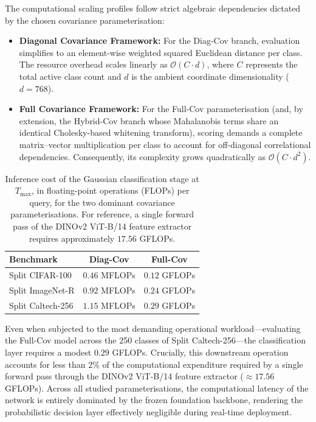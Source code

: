 The computational scaling profiles follow strict algebraic dependencies dictated by the chosen covariance parameterisation:
\begin{itemize}
	\item \textbf{Diagonal Covariance Framework:} For the Diag-Cov branch, evaluation simplifies to an element-wise weighted squared Euclidean distance per class. The resource overhead scales linearly as $\mathcal{O}(C \cdot d)$, where $C$ represents the total active class count and $d$ is the ambient coordinate dimensionality ($d = 768$).
	\item \textbf{Full Covariance Framework:} For the Full-Cov parameterisation (and, by extension, the Hybrid-Cov branch whose Mahalanobis terms share an identical Cholesky-based whitening transform), scoring demands a complete matrix--vector multiplication per class to account for off-diagonal correlational dependencies. Consequently, its complexity grows quadratically as $\mathcal{O}(C \cdot d^2)$.
\end{itemize}

\begin{table}[htbp]
	\centering
	\caption{Inference cost of the Gaussian classification stage at $T_{\max}$, in floating-point operations (FLOPs) per query, for the two dominant covariance parameterisations. For reference, a single forward pass of the DINOv2 ViT-B/14 feature extractor requires approximately $17.56$ GFLOPs.}
	\label{tab:computational_requirements}
	\small
	\setlength{\tabcolsep}{8pt}
	\begin{tabular}{lcc}
		\toprule
		\textbf{Benchmark} & \textbf{Diag-Cov} & \textbf{Full-Cov} \\
		\midrule
		Split CIFAR-100   & $0.46$ MFLOPs & $0.12$ GFLOPs \\
		Split ImageNet-R  & $0.92$ MFLOPs & $0.24$ GFLOPs \\
		Split Caltech-256 & $1.15$ MFLOPs & $0.29$ GFLOPs \\
		\bottomrule
	\end{tabular}
\end{table}

Even when subjected to the most demanding operational workload—evaluating the Full-Cov model across the 250 classes of Split Caltech-256—the classification layer requires a modest $0.29$ GFLOPs. Crucially, this downstream operation accounts for less than $2\%$ of the computational expenditure required by a single forward pass through the DINOv2 ViT-B/14 feature extractor ($\approx 17.56$ GFLOPs). Across all studied parameterisations, the computational latency of the network is entirely dominated by the frozen foundation backbone, rendering the probabilistic decision layer effectively negligible during real-time deployment.

